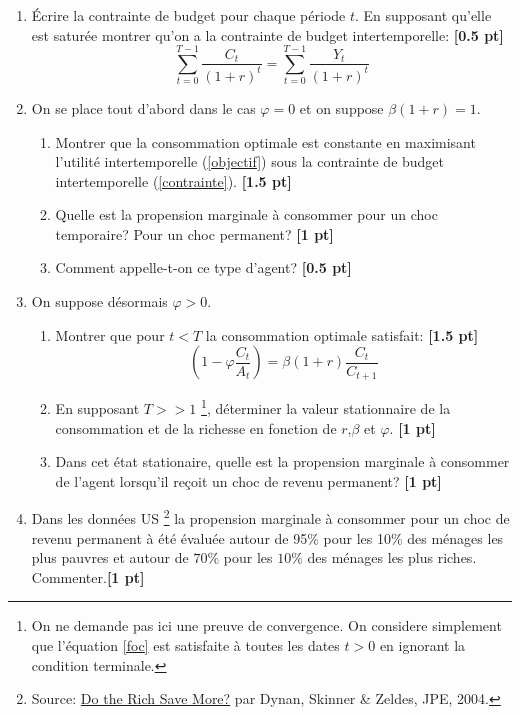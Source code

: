 \documentclass[a4paper,12pt]{article}
\begin{document}
\begin{enumerate}
    \item Écrire la contrainte de budget pour chaque période $t$. En supposant qu'elle est saturée montrer qu'on a la contrainte de budget intertemporelle: \hfill\textbf{[0.5 pt]} 
    \begin{equation}
    \sum_{t=0}^{T-1} \frac{C_t}{(1+r)^t} = \sum_{t=0}^{T-1} \frac{Y_t}{(1+r)^t} \label{contrainte}
    \end{equation}
    \item  On se place tout d'abord dans le cas $\varphi=0$ et on suppose $\beta (1+r)=1$.
        \begin{enumerate}
            \item Montrer que la consommation optimale est constante en maximisant l'utilité intertemporelle (\ref{objectif}) sous la contrainte de budget intertemporelle (\ref{contrainte}). \hfill \textbf{[1.5 pt]}  
            \item Quelle est la propension marginale à consommer pour un choc temporaire? Pour un choc permanent? \hfill \textbf{[1 pt]}  
            \item Comment appelle-t-on ce type d'agent? \hfill \textbf{[0.5 pt]}
        \end{enumerate} 
    
    \item On suppose désormais  $\varphi>0$.
            \begin{enumerate}
                \item Montrer que pour $t<T$ la consommation optimale satisfait: \hfill\textbf{[1.5 pt]}
                    \begin{equation}
                    \left(1-\varphi \frac{C_t}{A_t}  \right) = \beta (1+r) \frac{C_t}{C_{t+1}}
                    \label{foc}
                    \end{equation}
                \item En supposant $T>>1$ \footnote{On ne demande pas ici une preuve de convergence. 
                On considere simplement que l'équation \ref{foc} est satisfaite à toutes les dates $t>0$ en ignorant la condition terminale.}, déterminer la valeur stationnaire de la consommation et de la richesse en fonction de $r$,$\beta$ et $\varphi$. \hfill\textbf{[1 pt]}
                \item Dans cet état stationaire, quelle est la propension marginale à consommer de l'agent lorsqu'il reçoit un choc de revenu permanent? \hfill\textbf{[1 pt]}
            \end{enumerate} 

    \item Dans les données US 
    \footnote{Source: \underline{Do the Rich Save More?} par Dynan, Skinner \& Zeldes, JPE, 2004. } 
    la propension marginale à consommer pour un choc de revenu permanent à été évaluée autour de 95\% pour les 10\% des ménages les plus pauvres et autour de $70\%$ pour les $10\%$ des ménages les plus riches. \\
    Commenter.\hfill\textbf{[1 pt]}
    \end{enumerate}
\end{document}
